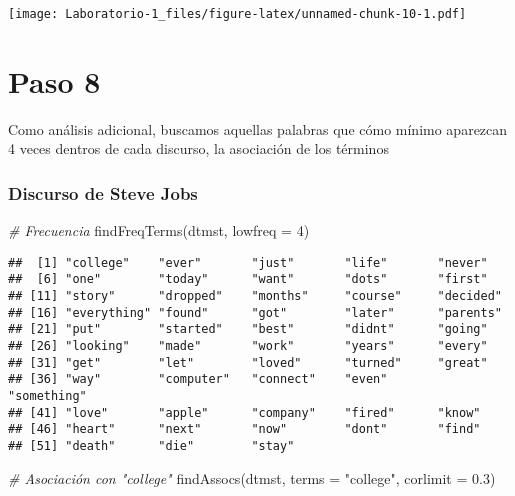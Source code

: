 \documentclass[
]{article}
\newenvironment{Shaded}{\begin{snugshade}}{\end{snugshade}}
\newcommand{\AttributeTok}[1]{\textcolor[rgb]{0.77,0.63,0.00}{#1}}
\newcommand{\CommentTok}[1]{\textcolor[rgb]{0.56,0.35,0.01}{\textit{#1}}}
\newcommand{\DecValTok}[1]{\textcolor[rgb]{0.00,0.00,0.81}{#1}}
\newcommand{\FloatTok}[1]{\textcolor[rgb]{0.00,0.00,0.81}{#1}}
\newcommand{\FunctionTok}[1]{\textcolor[rgb]{0.00,0.00,0.00}{#1}}
\newcommand{\NormalTok}[1]{#1}
\newcommand{\StringTok}[1]{\textcolor[rgb]{0.31,0.60,0.02}{#1}}
\begin{document}
\texttt{[image: Laboratorio-1\_files/figure-latex/unnamed-chunk-10-1.pdf]}

\hypertarget{paso-8}{%
\section{Paso 8}\label{paso-8}}

Como análisis adicional, buscamos aquellas palabras que cómo mínimo
aparezcan 4 veces dentros de cada discurso, la asociación de los
términos

\hypertarget{discurso-de-steve-jobs-1}{%
\subsubsection{Discurso de Steve Jobs}\label{discurso-de-steve-jobs-1}}

\begin{Shaded}
\begin{Highlighting}[]
\CommentTok{\# Frecuencia}
\FunctionTok{findFreqTerms}\NormalTok{(dtmst, }\AttributeTok{lowfreq =} \DecValTok{4}\NormalTok{)}
\end{Highlighting}
\end{Shaded}

\begin{verbatim}
##  [1] "college"    "ever"       "just"       "life"       "never"     
##  [6] "one"        "today"      "want"       "dots"       "first"     
## [11] "story"      "dropped"    "months"     "course"     "decided"   
## [16] "everything" "found"      "got"        "later"      "parents"   
## [21] "put"        "started"    "best"       "didnt"      "going"     
## [26] "looking"    "made"       "work"       "years"      "every"     
## [31] "get"        "let"        "loved"      "turned"     "great"     
## [36] "way"        "computer"   "connect"    "even"       "something" 
## [41] "love"       "apple"      "company"    "fired"      "know"      
## [46] "heart"      "next"       "now"        "dont"       "find"      
## [51] "death"      "die"        "stay"
\end{verbatim}

\begin{Shaded}
\begin{Highlighting}[]
\CommentTok{\# Asociación con "college"}
\FunctionTok{findAssocs}\NormalTok{(dtmst, }\AttributeTok{terms =} \StringTok{"college"}\NormalTok{, }\AttributeTok{corlimit =} \FloatTok{0.3}\NormalTok{)}
\end{Highlighting}
\end{Shaded}
\end{document}
